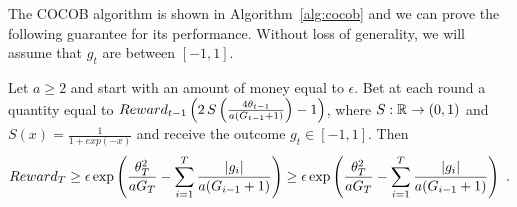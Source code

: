 The \ac{COCOB} algorithm is shown in Algorithm~\ref{alg:cocob} and we can prove the following guarantee for its performance.
Without loss of generality, we will assume that $g_t$ are between $[-1,1]$.
%
\begin{theorem}
Let $a\geq2$ and start with an amount of money equal to $\epsilon$. Bet at each round a quantity equal to
$Reward_{t-1} \left(2 \, S\left(\frac{4 \theta_{t-1}}{a (G_{t-1} + 1)}\right)-1\right)$, where $S:\mathbb{R}\rightarrow(0,1)$ and $S(x)=\frac{1}{1+exp(-x)}$ and receive the outcome $g_t \in [-1,1]$. Then
\begin{align*}
Reward_{T} 
\geq \epsilon \exp\left(\frac{\theta_{T}^2}{a G_{T}} - \sum_{i=1}^{T} \frac{|g_i|}{a( G_{i-1} + 1) } \right)
\geq \epsilon \exp\left(\frac{\theta_{T}^2}{a G_{T}} - \sum_{i=1}^{T} \frac{|g_i|}{a( G_{i-1} + 1) } \right)~.
\end{align*}
\end{theorem}
%
